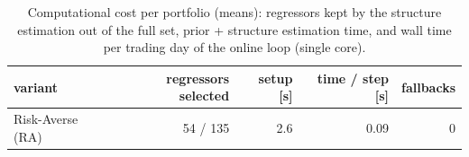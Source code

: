 \begin{table}[ht!]
\centering
\small
\begin{tabular}{lrrrr}
\hline
variant & regressors selected & setup [s] & time / step [s] & fallbacks \\
\hline
Risk-Averse (RA) & 54 / 135 & 2.6 & 0.09 & 0 \\
\hline
\end{tabular}
\caption{Computational cost per portfolio (means): regressors kept by the structure estimation out of the full set, prior + structure estimation time, and wall time per trading day of the online loop (single core).}
\label{tab:runtime_partial}
\end{table}
